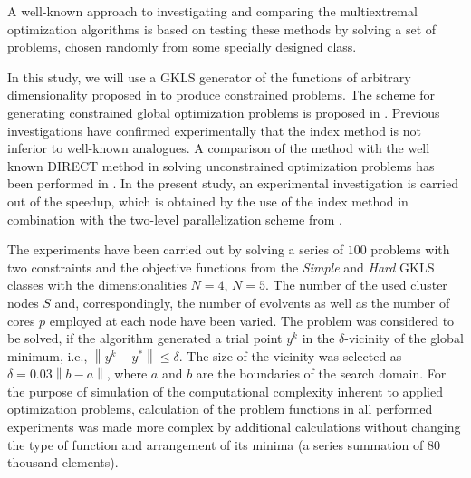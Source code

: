 \documentclass[smallextended]{svjour3}       %
\begin{document}
A well-known approach to investigating and comparing the multiextremal optimization algorithms is based on testing these methods by solving a set of problems, chosen randomly from some specially designed class.


In this study, we will use a GKLS generator of the functions of arbitrary dimensionality proposed in \cite{Gaviano2003} to produce constrained problems. The scheme for generating constrained global optimization problems is proposed in \cite{Gergel2017}. Previous investigations have confirmed experimentally that the index method is not inferior to well-known analogues. A comparison of the method with the well known DIRECT method \cite{Jones2001} in solving unconstrained optimization problems has been performed in \cite{Barkalov2015,Barkalov2016}. In the present study, an experimental investigation is carried out of the speedup, which is obtained by the use of the index method in combination with the two-level parallelization scheme from \cite{Sidorov2015}.

The experiments have been carried out by solving a series of $100$ problems with two constraints and the objective functions from the \textit{Simple} and \textit{Hard} GKLS classes with the dimensionalities $N=4$, $N=5$. The number of the used cluster nodes $S$ and, correspondingly, the number of evolvents as well as the number of cores $p$ employed at each node have been varied. The problem was considered to be solved, if the algorithm generated a trial point $y^k$ in the $\delta$-vicinity of the global minimum, i.e., $\left\|y^k-y^*\right\|\leq \delta$. The size of the vicinity was selected as $\delta=0.03\left\|b-a\right\|$, where $a$ and $b$ are the boundaries of the search domain. For the purpose of simulation of the computational complexity inherent to applied optimization problems, calculation of the problem functions in all performed experiments was made more complex by additional calculations without changing the type of function and arrangement of its minima (a series summation of $80$ thousand elements).
\end{document}
